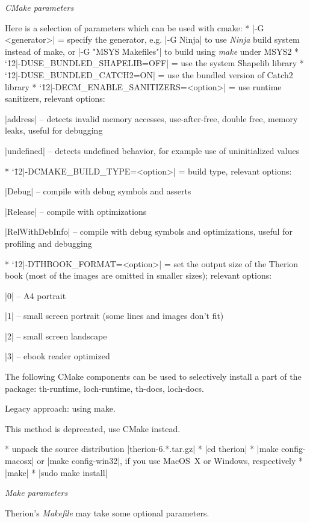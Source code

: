 {\it CMake parameters}

Here is a selection of parameters which can be used with cmake:
\list
* |-G <generator>| = specify the generator, e.g.
  |-G Ninja| to use {\it Ninja} build system instead of make,
  or |-G "MSYS Makefiles"| to build using {\it make} under MSYS2
* {\catcode`\=12|-DUSE_BUNDLED_SHAPELIB=OFF|} = use the system Shapelib library
* {\catcode`\=12|-DUSE_BUNDLED_CATCH2=ON|} = use the bundled version of Catch2 library
* {\catcode`\=12|-DECM_ENABLE_SANITIZERS=<option>|} = use runtime sanitizers, relevant options:

  |address| -- detects invalid memory accesses, use-after-free, double free, memory leaks, useful for debugging

  |undefined| -- detects undefined behavior, for example use of uninitialized values

* {\catcode`\=12|-DCMAKE_BUILD_TYPE=<option>|} = build type, relevant options:

  |Debug| -- compile with debug symbols and asserts

  |Release| -- compile with optimizations

  |RelWithDebInfo| -- compile with debug symbols and optimizations, useful for profiling and debugging

* {\catcode`\=12|-DTHBOOK_FORMAT=<option>|} = set the output size of the Therion book (most of the images are
  omitted in smaller sizes); relevant options:

  |0| -- A4 portrait

  |1| -- small screen portrait (some lines and images don't fit)

  |2| -- small screen landscape

  |3| -- ebook reader optimized

\endlist

The following CMake components can be used to selectively install a part of the package: th-runtime, loch-runtime,
th-docs, loch-docs.

\subsubchapter Legacy approach: using make.

This method is deprecated, use CMake instead.

\iffalse
\list
* unpack the source distribution |therion-6.*.tar.gz|
* |cd therion|
* |make config-macosx| or |make config-win32|, if you use MacOS~X or Windows,
  respectively
* |make|
* |sudo make install|
\endlist

{\it Make parameters}

Therion's {\it Makefile} may take some optional parameters.

